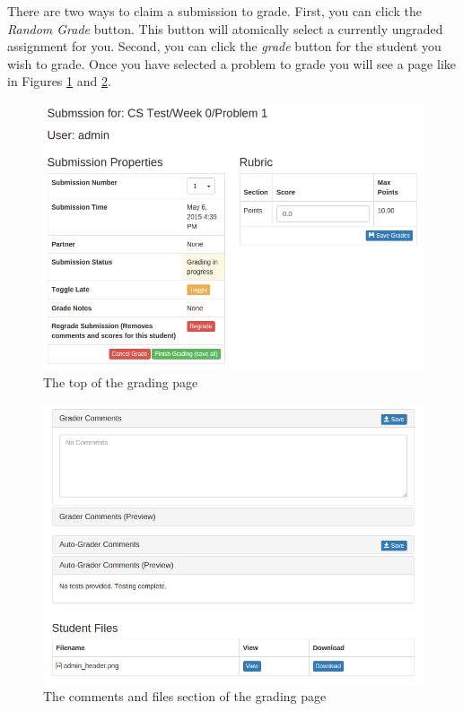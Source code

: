 \documentclass[11pt]{report}
\begin{document}
There are two ways to claim a submission to grade. First, you can click the \emph{Random Grade} button.
This button will atomically select a currently ungraded assignment for you. Second, you can click the 
\emph{grade} button for the student you wish to grade. Once you have selected a problem to grade you will
see a page like in Figures \ref{fig:grade_page_top} and \ref{fig:grade_page_bottom}.

\begin{figure}
\centering
\includegraphics[width=\textwidth,height=\textheight,keepaspectratio]{diagrams/grade_top}
\caption{The top of the grading page}
\label{fig:grade_page_top}
\end{figure}

\begin{figure}
\centering
\includegraphics[width=\textwidth,height=\textheight,keepaspectratio]{diagrams/grade_bottom}
\caption{The comments and files section of the grading page}
\label{fig:grade_page_bottom}
\end{figure}
\end{document}
